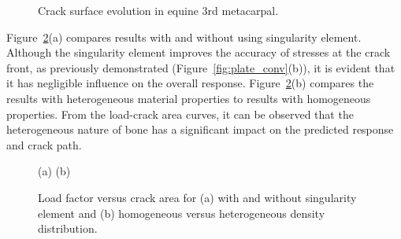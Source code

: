 \documentclass[onecolumn]{svjour3}
\begin{document}
\begin{figure}[h!]
	\centering
	\begin{centering}
	\end{centering}		
		\caption{Crack surface evolution in equine 3rd metacarpal.}
		\label{fig:crack_snapshots}
\end{figure}
% 
% 
Figure~\ref{fig:load_factor1}(a) compares results with and without using singularity element. Although the singularity element improves the accuracy of stresses at the crack front, as previously demonstrated (Figure~\ref{fig:plate_conv}(b)), it is evident that it has negligible influence on the overall response. Figure~\ref{fig:load_factor1}(b) compares the results with heterogeneous material properties to results with homogeneous properties. From the load-crack area curves, it can be observed that the heterogeneous nature of bone has a significant impact on the predicted response and crack path. 
% 
\begin{figure}[h]
	\centering
	\begin{minipage}{.45\textwidth}
\end{minipage}%
\quad
\begin{minipage}{.45\textwidth}
\end{minipage}
% 
(a) \hspace{5cm} (b)
	\caption{Load factor versus crack area for (a) with and without singularity element and (b) homogeneous versus heterogeneous density distribution.}
	\label{fig:load_factor1}
\end{figure}
\end{document}
